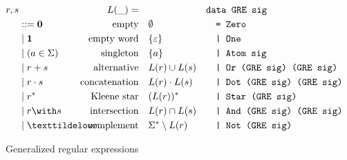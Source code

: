 \begin{figure}[tp]
  \begin{align*}
    r, s & &L(\_)=\quad &  &
                             \makebox[1em][l]{\code{data GRE sig}}\\
         & ::= \Rnull & \ltext{empty}
                        & \emptyset
                           &&\code{= Zero}\\
         & \mid \Rempty & \ltext{empty word}
                        & \{ \varepsilon \}
                           && \code{| One}\\
         & \mid (a \in \Sigma) & \ltext{singleton}
                        &  \{ a \}
                           && \code{| Atom sig} \\
         & \mid \Runion rs & \ltext{alternative}
                        &  L (r) \cup L (s)
                           && \code{| Or (GRE sig) (GRE sig)}\\
         & \mid \Rconcat rs & \ltext{concatenation}
                        &  L (r) \cdot L (s)
                           && \code{| Dot (GRE sig) (GRE sig)}\\
         & \mid \Rstar r & \ltext{Kleene star}
                        & (L (r))^* 
                           && \code{| Star (GRE sig)}\\
         & \mid \Rintersect rs & \ltext{intersection}
                        & L (r) \cap L (s)
                           && \code{| And (GRE sig) (GRE sig)}\\
         & \mid \Rcomplement r & \ltext{complement}
                        & \Sigma^* \setminus L (r)
                           && \code{| Not (GRE sig)}
  \end{align*}
  \caption{Generalized regular expressions}
  \label{fig:generalized-regular-expressions}
\end{figure}


